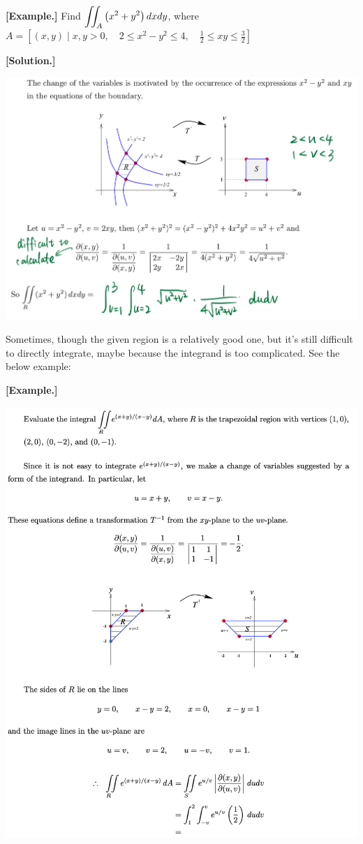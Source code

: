 \documentclass[11pt, a4paper]{MATH2023}
\newcommand{\eg}{\textbf{[Example.] }}
\newcommand{\sol}{\textbf{[Solution.] }}
\begin{document}
\begin{spacing}{1.3}
    \newpage
    \eg Find $\displaystyle \iint_{A}\left(x^{2}+y^{2}\right) d x d y$, 
    where $A=\left[(x, y) \mid x, y>0, \quad 2 \leqslant x^{2}-y^{2} \leqslant 4, \quad \frac{1}{2} \leqslant x y \leqslant \frac{3}{2}\right]$

    \sol 
    
    \includegraphics[scale=0.25]{images/Ch14-jacobian-eg3.jpeg}


    \newpage
    Sometimes, though the given region is a relatively good one, but it's still difficult to directly
    integrate, maybe because the integrand is too complicated. See the below example:

    \eg 
    
    \includegraphics[scale=0.77]{images/Ch14-jacobian-eg4.png}
    



\end{spacing}
\end{document}
